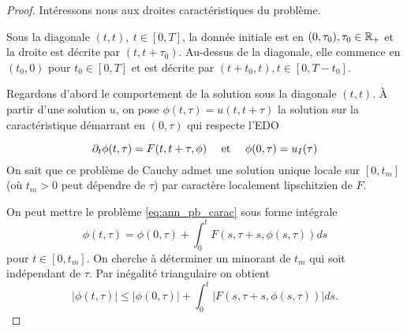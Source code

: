 \begin{proof}
Intéressons nous aux droites caractéristiques du problème. 
\\
\begin{minipage}{.5\textwidth}
\end{minipage} \hfill
%
\begin{minipage}[t]{.48\textwidth}
\vspace*{-2.8cm}
Sous la diagonale $(t,t),\ t\in [0,T]$, la donnée initiale est en $(0,\tau_0), \tau_0\in\mathbb{R}_+$ et la droite est décrite par $(t,t+\tau_0)$. 
Au-dessus de la diagonale, elle commence en $(t_0,0)$ pour $t_0\in [0,T]$ et est décrite par $(t+t_0,t), t\in[0,T-t_0]$. 

\hspace{.5cm}Regardons d'abord le comportement de la solution sous la diagonale $(t,t)$. À partir d'une solution $u$, on pose $\phi(t,\tau) = u(t, t+\tau)$ la solution sur la caractéristique démarrant en $(0,\tau)$ qui respecte l'EDO
\end{minipage}
\begin{equation}
\partial_t\phi(t,\tau) = 
F(t,t + \tau,\phi) \quad \text{ et }\quad \phi(0,\tau) = u_I(\tau) 
\label{eq:ann_pb_carac}
\end{equation} 
On sait que ce problème de Cauchy admet une solution unique locale sur $[0,t_m]$ (où $t_m > 0$ peut dépendre de $\tau$) par caractère localement lipschitzien de $F$. 

On peut mettre le problème \eqref{eq:ann_pb_carac} sous forme intégrale
$$ \phi(t,\tau) = \phi(0,\tau) + \int_0^t F(s,\tau+s,\phi(s,\tau))ds $$
pour $t \in [0,t_m]$. 
On cherche à déterminer un minorant de $t_m$ qui soit indépendant de $\tau$. 
Par inégalité triangulaire on obtient 
\begin{equation} 
|\phi(t,\tau)| \leq |\phi(0,\tau)| + \int_0^t |F(s,\tau+s,\phi(s,\tau))| ds.
\label{eq:ann_ineg_cauchy}
\end{equation}


\end{proof}
